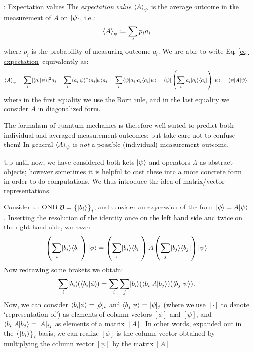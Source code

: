\begin{defbox}{: Expectation values}
    The \emph{expectation value} $\left< A \right>_\psi$ is the average outcome in the measurement of $A$ on $\lvert \psi \rangle$, i.e.:
    \begin{equation}\label{eq-expectation}
        \left< A \right>_\psi \coloneqq \sum_i p_i a_i
    \end{equation}
    where $p_i$ is the probability of measuring outcome $a_i$. We are able to write Eq. \eqref{eq-expectation} equivalently as:
    \begin{equation}\label{eq-expection2}
        \left< A \right>_\psi = \sum_i \lvert \langle a_i \lvert \psi \rangle \rvert^2 a_i = \sum_i \langle a_i \lvert \psi \rangle^* \langle a_i \lvert \psi \rangle a_i = \sum_i \langle \psi \lvert a_i \rangle a_i \langle a_i \lvert \psi \rangle = \langle \psi \rvert\left(\sum_i a_i \lvert a_i \rangle \langle a_i \rvert\right)\lvert \psi \rangle = \langle \psi \rvert A\lvert \psi \rangle.
    \end{equation}
    where in the first equality we use the Born rule, and in the last equality we consider $A$ in diagonalized form.
\end{defbox}

The formalism of quantum mechanics is therefore well-suited to predict both individual and averaged measurement outcomes; but take care not to confuse them! In general $\left< A \right>_\psi$ is \emph{not} a possible (individual) measurement outcome.

Up until now, we have considered both kets $\lvert \psi \rangle$ and operators $A$ as abstract objects; however sometimes it is helpful to cast these into a more concrete form in order to do computations. We thus introduce the idea of matrix/vector representations.

Consider an ONB $\mathcal{B} = \set{\lvert b_i \rangle}_i$, and consider an expression of the form $\ket{\phi} = A\ket{\psi}$. Inserting the resolution of the identity once on the left hand side and twice on the right hand side, we have:
\begin{equation}
    \left(\sum_i \dyad{b_i}{b_i}\right)\ket{\phi} = \left(\sum_i \dyad{b_i}{b_i}\right)A\left(\sum_j \dyad{b_j}{b_j}\right)\ket{\psi}
\end{equation}
Now redrawing some brakets we obtain:
\begin{equation}
    \sum_i \ket{b_i}(\braket{b_i}{\phi}) = \sum_{i}\sum_j \ket{b_i}(\bra{b_i}A\ket{b_j})(\braket{b_j}{\psi}).
\end{equation}
Now, we can consider $\braket{b_i}{\phi} = [\phi]_i$ and $\langle b_j \lvert \psi \rangle = [\psi]_j$ (where we use $[\cdot]$ to denote `representation of') as elements of column vectors $[\phi]$ and $[\psi]$, and $\langle b_i \rvert A\lvert b_j \rangle = [A]_{ij}$ as elements of a matrix $[A]$. In other words, expanded out in the $\set{\lvert b_i \rangle}_i$ basis, we can realize $[\phi]$ is the column vector obtained by multiplying the column vector $[\psi]$ by the matrix $[A]$.

